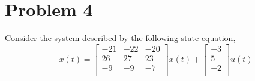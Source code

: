 \documentclass{article}
\begin{document}
\begin{enumerate}[(a)]
\begin{figure}[!htb]
\centering
\texttt{[image: \{images/p3\_step\_response]}.png}
\end{figure}

\end{enumerate}

\newpage
\section*{Problem 4}
Consider the system described by the following state equation,
$$ \dot{x}(t) =
\begin{bmatrix}
-21 & -22 & -20 \\
26 & 27 & 23 \\
-9 & -9 & -7 \\
\end{bmatrix}
x(t) +
\begin{bmatrix}
-3 \\
5 \\
-2 \\
\end{bmatrix}
u(t)
$$
\end{document}
